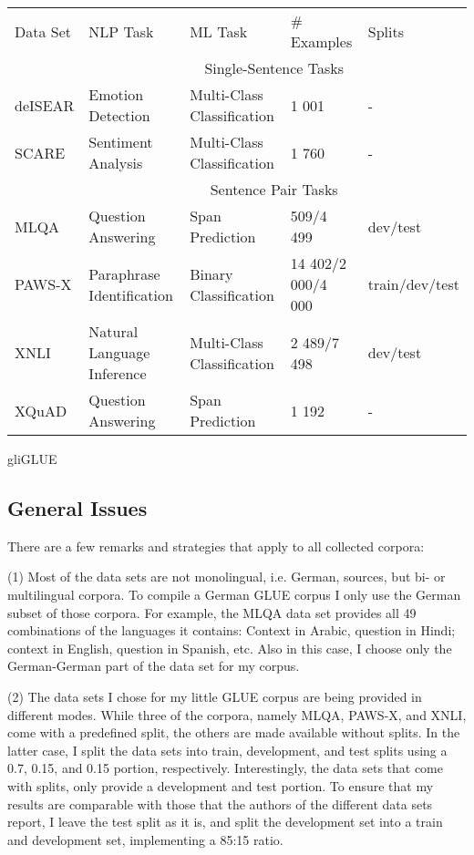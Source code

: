 {\begin{tabular}{l|llll}
	Data Set & NLP Task & ML Task & \# Examples & Splits \\
	\hhline{=|====}
	& \multicolumn{4}{c}{Single-Sentence Tasks} \\
	deISEAR &  Emotion Detection & Multi-Class Classification  & 1 001 & - \\
	SCARE & Sentiment Analysis & Multi-Class Classification & 1 760 & - \\
	\hline
	& \multicolumn{4}{c}{Sentence Pair Tasks} \\
	MLQA & Question Answering & Span Prediction & 509/4 499 & dev/test \\
	PAWS-X & Paraphrase Identification & Binary Classification & 14 402/2 000/4 000 & train/dev/test \\
	XNLI & Natural Language Inference & Multi-Class Classification &  2 489/7 498 & dev/test \\
	XQuAD & Question Answering & Span Prediction &  1 192 & - \\
\end{tabular}
}{gliGLUE}

\subsection{General Issues}

There are a few remarks and strategies that apply to all collected corpora:

(1) Most of the data sets are not monolingual, i.e. German, sources, but bi- or multilingual 
corpora.
To compile a German GLUE corpus I only use the German subset of those corpora.
For example, the MLQA data set provides all 49 combinations of the languages it contains:
Context in Arabic, question in Hindi; context in English, question in Spanish, etc.
Also in this case, I choose only the German-German part of the data set for my corpus.

(2) The data sets I chose for my little GLUE corpus are being provided in different modes.
While three of the corpora, namely MLQA, PAWS-X, and XNLI, come with a predefined split, the 
others are made available without splits.
In the latter case, I split the data sets into train, development, and test splits using a 0.7, 
0.15, and 0.15 portion, respectively.
Interestingly, the data sets that come with splits, only provide a development and test portion.
To ensure that my results are comparable with those that the authors of the different data sets 
report, I leave the test split as it is, and split the development set into a train and 
development set, implementing a 85:15 ratio.

